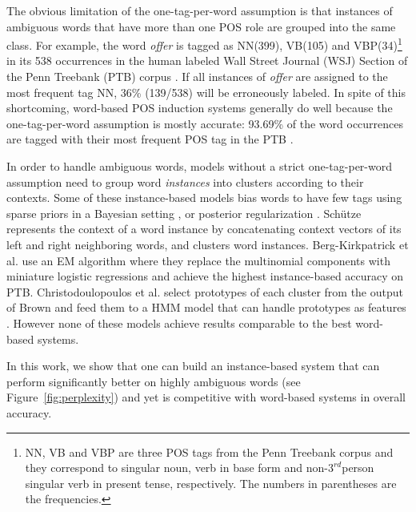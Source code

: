 The obvious limitation of the one-tag-per-word assumption is that
instances of ambiguous words that have more than one POS role are
grouped into the same class.  For example, the word {\em offer} is
tagged as NN(399), VB(105) and VBP(34)\footnote{NN, VB and VBP are
  three POS tags from the Penn Treebank corpus and they correspond to
  singular noun, verb in base form and non-$3^{rd}$person singular
  verb in present tense, respectively.  The numbers in parentheses are
  the frequencies.} in its 538 occurrences in the human labeled Wall
Street Journal (WSJ) Section of the Penn Treebank (PTB) corpus
\cite{treebank3}.  If all instances of {\em offer} are assigned to the
most frequent tag NN, 36\% (139/538) will be erroneously labeled.  In
spite of this shortcoming, word-based POS induction systems generally
do well because the one-tag-per-word assumption is mostly accurate:
93.69\% of the word occurrences are tagged with their most frequent
POS tag in the PTB \cite{Toutanova:2003:FPT:1073445.1073478}.

In order to handle ambiguous words, models without a strict
one-tag-per-word assumption need to group word {\em instances} into
clusters according to their contexts.  Some of these instance-based
models bias words to have few tags using sparse priors in a Bayesian
setting
\cite{goldwater-griffiths:2007:ACLMain,johnson:2007:EMNLP-CoNLL2007,Gao:2008:CBE:1613715.1613761},
or posterior regularization \cite{Ganchev:2010:PRS:1859890.1859918}.
Sch\"{u}tze  represents the context of a word
instance by concatenating context vectors of its left and right
neighboring words, and clusters word instances.  Berg-Kirkpatrick et
al.   use an EM algorithm
where they replace the multinomial components with miniature logistic
regressions and achieve the highest instance-based accuracy on PTB.
Christodoulopoulos et al.
 select
prototypes of each cluster from the output of Brown
 and feed them to a HMM model
that can handle prototypes as features
\cite{Haghighi:2006:PLS:1220835.1220876}.  However none of these
models achieve results comparable to the best word-based systems.  

In this work, we show that one can build an instance-based system that
can perform significantly better on highly ambiguous words (see
Figure~\ref{fig:perplexity}) and yet is competitive with word-based
systems in overall accuracy.


